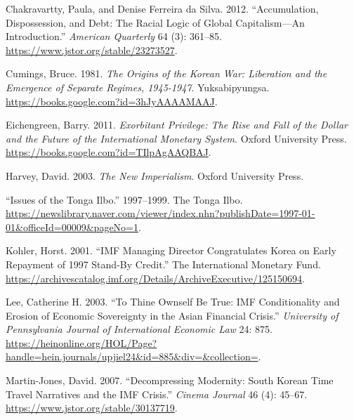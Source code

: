 \hypertarget{refs}{}
\begin{CSLReferences}{1}{0}
\leavevmode{}%
Chakravartty, Paula, and Denise Ferreira da Silva. 2012.
{``Accumulation, {Dispossession}, and {Debt}: The {Racial Logic} of
{Global Capitalism}---{An Introduction}.''} \emph{American Quarterly} 64
(3): 361--85. \url{https://www.jstor.org/stable/23273527}.

\leavevmode{}%
Cumings, Bruce. 1981. \emph{The {Origins} of the {Korean War}:
Liberation and the Emergence of Separate Regimes, 1945-1947}.
{Yuksabipyungsa}. \url{https://books.google.com?id=3hJyAAAAMAAJ}.

\leavevmode{}%
Eichengreen, Barry. 2011. \emph{Exorbitant {Privilege}: The {Rise} and
{Fall} of the {Dollar} and the {Future} of the {International Monetary
System}}. {Oxford University Press}.
\url{https://books.google.com?id=TIlpAgAAQBAJ}.

\leavevmode{}%
Harvey, David. 2003. \emph{The {New Imperialism}}. {Oxford University
Press}.

\leavevmode{}%
{``Issues of the Tonga Ilbo.''} 1997--1999. {The Tonga Ilbo}.
\url{https://newslibrary.naver.com/viewer/index.nhn?publishDate=1997-01-01\&officeId=00009\&pageNo=1}.

\leavevmode{}%
Kohler, Horst. 2001. {``{IMF Managing Director Congratulates Korea} on
{Early Repayment} of 1997 {Stand}-{By Credit}.''} {The International
Monetary Fund}.
\url{https://archivescatalog.imf.org/Details/ArchiveExecutive/125150694}.

\leavevmode{}%
Lee, Catherine H. 2003. {``To {Thine Ownself Be True}: {IMF
Conditionality} and {Erosion} of {Economic Sovereignty} in the {Asian
Financial Crisis}.''} \emph{University of Pennsylvania Journal of
International Economic Law} 24: 875.
\url{https://heinonline.org/HOL/Page?handle=hein.journals/upjiel24\&id=885\&div=\&collection=}.

\leavevmode{}%
Martin-Jones, David. 2007. {``Decompressing {Modernity}: South {Korean
Time Travel Narratives} and the {IMF Crisis}.''} \emph{Cinema Journal}
46 (4): 45--67. \url{https://www.jstor.org/stable/30137719}.


\end{CSLReferences}
